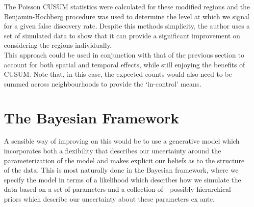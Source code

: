 \documentclass[11pt]{report}
\begin{document}
The Poisson CUSUM statistics were calculated for these modified regions and the Benjamin-Hochberg procedure was used to determine the level at which we signal for a given false discovery rate. Despite this methods simplicity, the author uses a set of simulated data to show that it can provide a significant improvement on considering the regions individually. \\ 

This approach could be used in conjunction with that of the previous section to account for both spatial and temporal effects, while still enjoying the benefits of CUSUM. Note that, in this case, the expected counts would also need to be summed across neighbourhoods to provide the `in-control' means. 

\chapter{The Bayesian Framework}

A sensible way of improving on this would be to use a generative model which incorporates both a flexibility that describes our uncertainty around the parameterization of the model and makes explicit our beliefs as to the structure of the data. This is most naturally done in the Bayesian framework, where we specify the model in terms of a likelihood which describes how we simulate the data based on a set of parameters and a collection of---possibly hierarchical---priors which describe our uncertainty about these parameters ex ante. 
\end{document}
